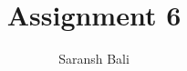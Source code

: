 \documentclass[journal,12pt,twocolumn]{IEEEtran}
\begin{document}
\makeatletter
{}
\makeatother
\let\StandardTheFigure\thefigure
\let\vec\mathbf
\renewcommand{\thefigure}{\theproblem}
\def\putbox#1#2#3{\makebox[0in][l]{\makebox[#1][l]{}\raisebox{\baselineskip}[0in][0in]{\raisebox{#2}[0in][0in]{#3}}}}
     \def\rightbox#1{\makebox[0in][r]{#1}}
     \def\centbox#1{\makebox[0in]{#1}}
     \def\topbox#1{\raisebox{-\baselineskip}[0in][0in]{#1}}
     \def\midbox#1{\raisebox{-0.5\baselineskip}[0in][0in]{#1}}
\vspace{3cm}
\title{Assignment 6}
\author{Saransh Bali}
%
%
%
% 
%
\end{document}
